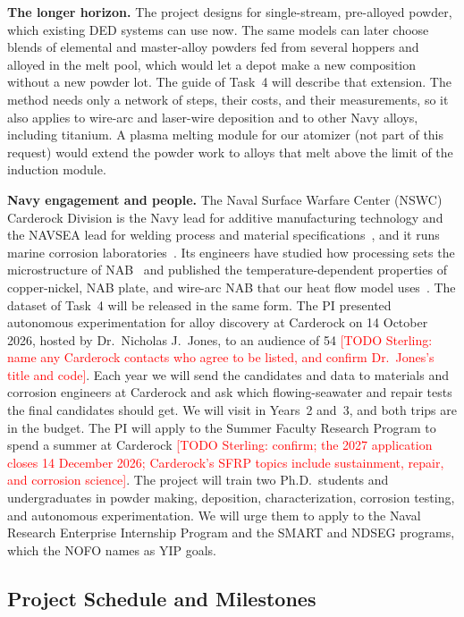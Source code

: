 \documentclass[12pt,letterpaper]{article}
\newcommand{\todo}[1]{\textcolor{red}{[TODO Sterling: #1]}}
\begin{document}
\textbf{The longer horizon.} The project designs for single-stream,
pre-alloyed powder, which existing DED systems can use now. The same models
can later choose blends of elemental and master-alloy powders fed from
several hoppers and alloyed in the melt pool, which would let a depot make a
new composition without a new powder lot. The guide of Task~4 will describe
that extension. The method needs only a network of steps, their costs, and
their measurements, so it also applies to wire-arc and laser-wire deposition
and to other Navy alloys, including titanium. A plasma melting module for our
atomizer (not part of this request) would extend the powder work to alloys
that melt above the limit of the induction module.

\textbf{Navy engagement and people.} The Naval Surface Warfare Center
(NSWC) Carderock Division is the Navy lead for additive manufacturing
technology and the NAVSEA lead for welding process and material
specifications~\cite{carderocksm}, and it runs marine corrosion
laboratories~\cite{carderockpartner}. Its engineers have studied how
processing sets the microstructure of NAB~\cite{orzolek2022} and published
the temperature-dependent properties of copper-nickel, NAB plate, and wire-arc
NAB that our heat flow model
uses~\cite{norkett2025,norkett2026a,norkett2026b,orzolek2023,hatala2021}. The
dataset of Task~4 will be released in the same form.
The PI presented autonomous experimentation for alloy discovery at Carderock
on 14 October 2026, hosted by
Dr.~Nicholas J.~Jones, to an audience of 54 \todo{name any Carderock
contacts who agree to be listed, and confirm Dr.~Jones's title and code}.
Each year we will send the candidates and data to materials and corrosion
engineers at Carderock and ask which flowing-seawater and repair tests the final candidates should get.
We will visit in Years~2 and~3, and both trips are in the budget.
The PI will apply to the Summer Faculty Research Program to
spend a summer at Carderock \todo{confirm; the 2027 application closes
14 December 2026; Carderock's SFRP topics include sustainment, repair, and
corrosion science}. The project will train two Ph.D.\
students and undergraduates in powder making, deposition,
characterization, corrosion testing, and autonomous experimentation. We will
urge them to apply to the Naval Research Enterprise Internship Program
and the SMART and NDSEG programs, which the NOFO names as YIP goals.

\subsection{Project Schedule and Milestones}
\end{document}
